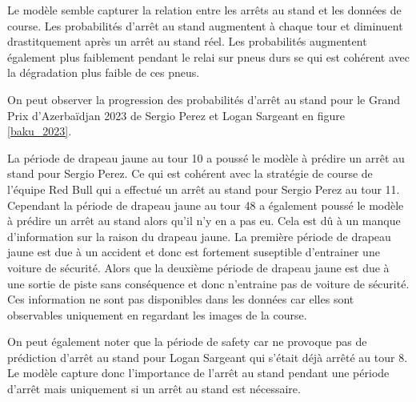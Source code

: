 Le modèle semble capturer la relation entre les arrêts au stand et les données de course.
Les probabilités d'arrêt au stand augmentent à chaque tour et diminuent drastitquement après un arrêt au stand réel.
Les probabilités augmentent également plus faiblement pendant le relai sur pneus durs se qui est cohérent avec la dégradation plus faible de ces pneus.

On peut observer la progression des probabilités d'arrêt au stand pour le Grand Prix d'Azerbaïdjan 2023 de Sergio Perez et Logan Sargeant en figure \ref{baku_2023}.


La période de drapeau jaune au tour 10 a poussé le modèle à prédire un arrêt au stand pour Sergio Perez.
Ce qui est cohérent avec la stratégie de course de l'équipe Red Bull qui a effectué un arrêt au stand pour Sergio Perez au tour 11.
Cependant la période de drapeau jaune au tour 48 a également poussé le modèle à prédire un arrêt au stand alors qu'il n'y en a pas eu.
Cela est dû à un manque d'information sur la raison du drapeau jaune. La première période de drapeau jaune est due à un accident et donc est fortement suseptible d'entrainer une voiture de sécurité.
Alors que la deuxième période de drapeau jaune est due à une sortie de piste sans conséquence et donc n'entraine pas de voiture de sécurité.
Ces information ne sont pas disponibles dans les données car elles sont observables uniquement en regardant les images de la course.

On peut également noter que la période de safety car ne provoque pas de prédiction d'arrêt au stand pour Logan Sargeant qui s'était déjà arrêté au tour 8.
Le modèle capture donc l'importance de l'arrêt au stand pendant une période d'arrêt mais uniquement si un arrêt au stand est nécessaire.